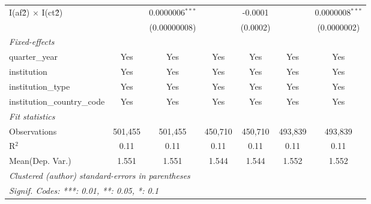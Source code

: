 \begin{tabular}{lcccccc}
   I(af\^2) $\times$ I(ct\^2)         &               & 0.0000006$^{***}$ &               & -0.0001        &               & 0.0000008$^{***}$\\   
                                      &               & (0.00000008)      &               & (0.0002)       &               & (0.0000002)\\   
   \midrule
   \emph{Fixed-effects}\\
   quarter\_year                      & Yes           & Yes               & Yes           & Yes            & Yes           & Yes\\  
   institution                        & Yes           & Yes               & Yes           & Yes            & Yes           & Yes\\  
   institution\_type                  & Yes           & Yes               & Yes           & Yes            & Yes           & Yes\\  
   institution\_country\_code         & Yes           & Yes               & Yes           & Yes            & Yes           & Yes\\  
   \midrule
   \emph{Fit statistics}\\
   Observations                       & 501,455       & 501,455           & 450,710       & 450,710        & 493,839       & 493,839\\  
   R$^2$                              & 0.11          & 0.11              & 0.11          & 0.11           & 0.11          & 0.11\\  
Mean(Dep. Var.) & 1.551 & 1.551 & 1.544 & 1.544 & 1.552 & 1.552 \\
   \midrule \midrule
   \multicolumn{7}{l}{\emph{Clustered (author) standard-errors in parentheses}}\\
   \multicolumn{7}{l}{\emph{Signif. Codes: ***: 0.01, **: 0.05, *: 0.1}}\\
\end{tabular}
\par\endgroup
